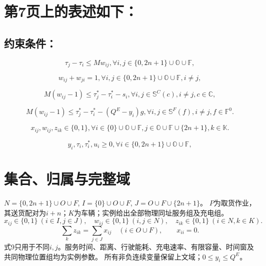 \documentclass[11pt]{ctexart}
\begin{document}
\newpage

\section{第7页上的表述如下：}

\subsection{约束条件：}
\begin{equation}
    \label{eq:24}
    \tau_j - \tau_i \le M w_{ij}, \forall i, j \in \{0, 2n + 1\} \cup \mathbb{O} \cup \mathbb{F}, \tag{24}
\end{equation}

\begin{equation}
    \label{eq:25}
    w_{ij} + w_{ji} = 1, \forall i, j \in \{0, 2n + 1\} \cup \mathbb{O} \cup \mathbb{F}, i \neq j, \tag{25}
\end{equation}

\begin{equation}
    \label{eq:26}
    M(w_{ij} - 1) \le \tau_j^* - \tau_i^* - s_i, \forall i, j \in \mathbb{S}^C(c), i \neq j, c \in \mathbb{C}, \tag{26}
\end{equation}

\begin{equation}
    \label{eq:27}
    M(w_{ij} - 1) \le \tau_j^* - \tau_i^* - (Q^E - y_i)g, \forall i, j \in \mathbb{S}^F(f), i \neq j, f \in \mathbb{F}^0. \tag{27}
\end{equation}

\begin{equation}
    \label{eq:28}
    x_{ij}, w_{ij}, z_{ik} \in \{0, 1\}, \forall i \in \{0\} \cup \mathbb{O} \cup \mathbb{F}, j \in \mathbb{O} \cup \mathbb{F} \cup \{2n + 1\}, k \in \mathbb{K}. \tag{28}
\end{equation}

\begin{equation}
    \label{eq:29}
    y_i, \tau_i, \tau_i^*, u_i \ge 0, \forall i \in \{0, 2n + 1\} \cup \mathbb{O} \cup \mathbb{F}, \tag{29}
\end{equation}



\section*{集合、归属与完整域}
$N=\{0,2n+1\}\cup O\cup F$, $I=\{0\}\cup O\cup F$, $J=O\cup F\cup\{2n+1\}$。
$P$为取货作业，其送货配对为$i+n$；$K$为车辆；实例给出全部物理同址服务组及充电组。
\[
x_{ij}\in\{0,1\}\ (i\in I,j\in J),\quad
w_{ij}\in\{0,1\}\ (i,j\in N),\quad z_{ik}\in\{0,1\}\ (i\in N,k\in K).
\]
\[
\sum_kz_{ik}=\sum_{j\in J}x_{ij}\quad(i\in O\cup F),\qquad x_{ii}=0.
\]
式9只用于不同$i,j$。服务时间、距离、行驶能耗、充电速率、有限容量、时间窗及共同物理位置组均为实例参数。
所有非负连续变量保留上文域；$0\le y_i\le Q^E$。
\end{document}

